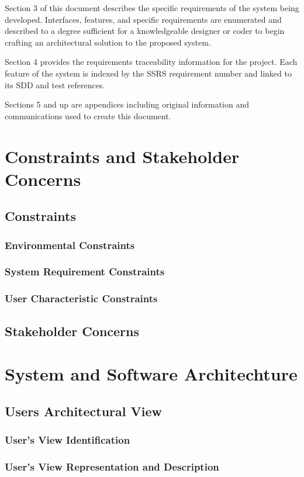 \documentclass[12pt, oneside, letterpaper]{report}
\begin{document}
		Section 3 of this document describes the specific requirements of
		the system being developed.  Interfaces, features, and specific
		requirements are enumerated and described to a degree sufficient
		for a knowledgeable designer or coder to begin crafting an
		architectural solution to the proposed system.

		Section 4 provides the requirements traceability information for
		the project.  Each feature of the system is indexed by the SSRS
		requirement number and linked to its SDD and test references.

		Sections 5 and up are appendices including original information
		and communications used to create this document.
\nopagebreak
\chapter{Constraints and Stakeholder Concerns}
	\section{Constraints}
		\subsection{Environmental Constraints}
		\subsection{System Requirement Constraints}
		\subsection{User Characteristic Constraints}
	\section{Stakeholder Concerns}
\chapter{System and Software Architechture}
	\section{Users Architectural View}
		\subsection{User's View Identification}
		\subsection{User's View Representation and Description}
\end{document}
